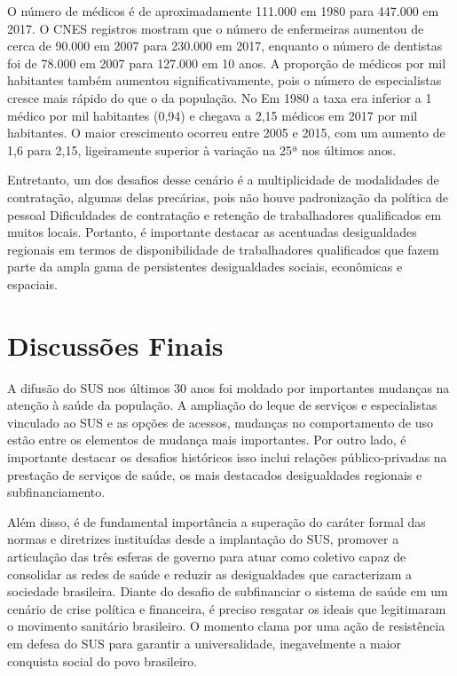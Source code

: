 \documentclass[twoside]{article}
\begin{document}
\begin{multicols}{2}
O número de médicos é de aproximadamente
111.000 em 1980 para 447.000 em 2017. O CNES
registros mostram que o número de enfermeiras aumentou de cerca de 90.000 em 2007 para 230.000 em 2017, enquanto o número de dentistas foi de 78.000 em 2007
para 127.000 em 10 anos.
A proporção de médicos por mil habitantes também aumentou significativamente, pois o número de especialistas cresce mais rápido do que o da população. No
Em 1980 a taxa era inferior a 1 médico por mil habitantes (0,94) e chegava a 2,15 médicos em 2017
por mil habitantes. O maior crescimento ocorreu
entre 2005 e 2015, com um aumento de 1,6 para
2,15, ligeiramente superior à variação na 25ª
nos últimos anos.

Entretanto, um dos desafios desse cenário é a multiplicidade de modalidades de contratação, algumas delas precárias, pois não houve padronização da política de pessoal
Dificuldades de contratação e retenção de trabalhadores qualificados em muitos locais. Portanto, é importante destacar as acentuadas desigualdades regionais em termos de disponibilidade de trabalhadores qualificados que fazem parte da ampla gama de persistentes desigualdades sociais, econômicas e espaciais. \cite{Viacava_2018}


  \section{Discussões Finais}
A  difusão do SUS nos últimos 30 anos foi moldado por importantes
mudanças na atenção à saúde da população. A
ampliação do leque de serviços e especialistas
vinculado ao SUS e as opções de acessos,
mudanças no comportamento de uso estão entre os elementos de mudança mais importantes. Por outro lado, é importante destacar os desafios históricos
isso inclui relações público-privadas
na prestação de serviços de saúde, os mais destacados
desigualdades regionais e subfinanciamento.

Além disso, é de fundamental importância a superação do caráter formal das normas e diretrizes instituídas desde a implantação do SUS, promover a articulação das três esferas de governo para atuar como coletivo capaz de consolidar as redes de saúde e reduzir as desigualdades que caracterizam a sociedade brasileira.
Diante do desafio de subfinanciar o sistema de saúde em um cenário de crise política e financeira, é preciso resgatar os ideais que legitimaram o movimento sanitário brasileiro. O momento clama por uma ação de resistência em defesa do SUS para garantir a universalidade, inegavelmente a maior conquista social do povo brasileiro.


\end{multicols}
\end{document}
